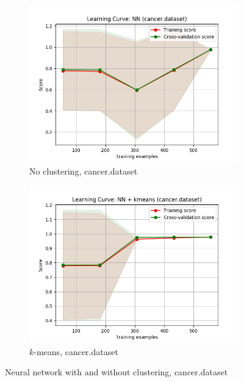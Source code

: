 \documentclass{article}
\begin{document}
    \begin{figure}[htb]
    \centering

      \begin{subfigure}{0.5\textwidth}
        \includegraphics[width=\linewidth]{out/nn_cluster/cancer-learning.png}
        \caption{No clustering, cancer.dataset}
      \end{subfigure}\hfil
      \begin{subfigure}{0.5\textwidth}
        \includegraphics[width=\linewidth]{out/nn_cluster/cancer-kmeans-learning.png}
        \caption{$k$-means, cancer.dataset}
      \end{subfigure}

    \caption{Neural network with and without clustering, cancer.dataset}
    \label{fig:nnc-plot-cancer}
    \end{figure}
\end{document}
